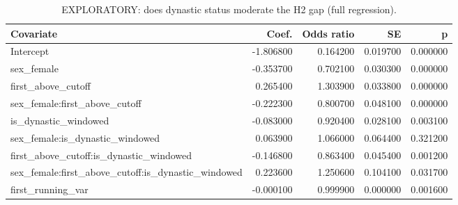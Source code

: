 \begin{table}[htbp]
\centering
\begin{tabular}{lrrrr}
\toprule
Covariate & Coef. & Odds ratio & SE & p \\
\midrule
Intercept & -1.806800 & 0.164200 & 0.019700 & 0.000000 \\
sex_female & -0.353700 & 0.702100 & 0.030300 & 0.000000 \\
first_above_cutoff & 0.265400 & 1.303900 & 0.033800 & 0.000000 \\
sex_female:first_above_cutoff & -0.222300 & 0.800700 & 0.048100 & 0.000000 \\
is_dynastic_windowed & -0.083000 & 0.920400 & 0.028100 & 0.003100 \\
sex_female:is_dynastic_windowed & 0.063900 & 1.066000 & 0.064400 & 0.321200 \\
first_above_cutoff:is_dynastic_windowed & -0.146800 & 0.863400 & 0.045400 & 0.001200 \\
sex_female:first_above_cutoff:is_dynastic_windowed & 0.223600 & 1.250600 & 0.104100 & 0.031700 \\
first_running_var & -0.000100 & 0.999900 & 0.000000 & 0.001600 \\
\bottomrule
\end{tabular}

\caption{EXPLORATORY: does dynastic status moderate the H2 gap (full regression).}
\label{tab:dynasty_moderation}
\end{table}
